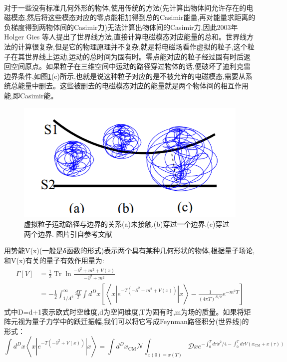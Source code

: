 \paragraph*{}
对于一些没有标准几何外形的物体,使用传统的方法(先计算出物体间允许存在的电磁模态,然后将这些模态对应的零点能相加得到总的Casimir能量,再对能量求距离的负梯度得到两物体间的Casimir力)无法计算出物体间的Casimir力,因此2003年Holger Gies 等人提出了世界线方法\cite{Gies_2003,Gies_2006},直接计算电磁模态对应能量的总和。世界线方法的计算很复杂,但是它的物理原理并不复杂,就是将电磁场看作虚拟的粒子,这个粒子在其世界线上运动,运动的总时间为固有时。零点能对应的粒子经过固有时后返回空间原点。如果粒子在三维空间中运动的路径穿过物体的话,便破坏了迪利克雷边界条件,如图\ref{fig:5}(c)所示,也就是说这种粒子对应的是不被允许的电磁模态,需要从系统总能量中删去。这些被删去的电磁模态对应的能量就是两个物体间的相互作用能,即Casimir能。
\begin{figure}
	\centering
	\includegraphics[scale=1]{figures/世界线2}
	\caption{虚拟粒子运动路径与边界的关系(a)未接触.(b)穿过一个边界.(c)穿过两个边界. 图片引自参考文献\cite{Gies_2003}}
	\label{fig:5}
\end{figure}
用势能V(x)(一般是δ函数的形式)表示两个具有某种几何形状的物体,根据量子场论,和V(x)有关的量子有效作用量为:
$$
\begin{aligned} \Gamma[V] &=\frac{1}{2} \operatorname{Tr} \ln \frac{-\partial^{2}+m^{2}+V(x)}{-\partial^{2}+m^{2}} \\ &=-\frac{1}{2} \int_{1 / \Lambda^{2}}^{\infty} \frac{d T}{T} \int d^{D} x\left[\left\langle x\left|e^{-T\left(-\partial^{2}+m^{2}+V(x)\right)}\right| x\right\rangle-\frac{1}{(4 \pi T)^{D / 2}} e^{-m^{2} T}\right] \end{aligned}
$$
式中D=d+1表示欧式时空维度,d为空间维度,T为固有时,m为场的质量。如果将矩阵元视为量子力学中的跃迁振幅,我们可以将它写成Feynman路径积分(世界线)的形式：
$$
\int d^{D} x\left\langle x\left|e^{-T\left(-\partial^{2}+V(x)\right)}\right| x\right\rangle=\int d^{D} x_{\mathrm{CM}} \mathcal{N} \int_{x(0)=x(T)} \mathcal{D} x e^{-\int_{0}^{T} d \tau \dot{x}^{2} / 4-\int_{0}^{T} d \tau V\left(x_{\mathrm{CM}}+x(\tau)\right)}
$$
